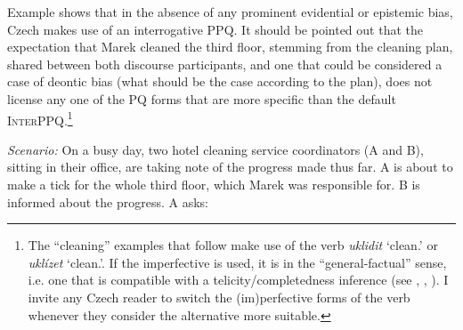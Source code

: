\documentclass[output=paper,colorlinks,citecolor=brown]{langscibook}
\begin{document}
Example  shows that in the absence of any prominent evidential or epistemic bias, Czech makes use of an interrogative PPQ. It should be pointed out that the expectation that Marek cleaned the third floor, stemming from the cleaning plan, shared between both discourse participants, and one that could be considered a case of deontic bias (what should be the case according to the plan), does not license any one of the PQ forms that are more specific than the default \textsc{InterPPQ}.\footnote{The ``cleaning'' examples that follow make use of the verb \textit{uklidit} `clean.{\PFV}' or \textit{uklízet} `clean.{\IPFV}'. If the imperfective is used, it is in the ``general-factual'' sense, i.e. one that is compatible with a telicity/completedness inference (see \citealt{gronndiss,muellerhab,Mueller-Reichau2018a}, , ). I invite any Czech reader to switch the (im)perfective forms of the verb whenever they consider the alternative more suitable.}

\eanoraggedright \textit{Scenario:} On a busy day, two hotel cleaning service coordinators (A and B), sitting in their office, are taking note of the progress made thus far. A is about to make a tick for the whole third floor, which Marek was responsible for. B is informed about the progress. A asks:\label{sim:ex:bias1}
\z\z
\end{document}
